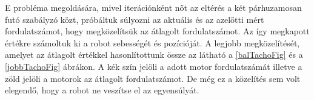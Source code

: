 E probléma megoldására, mivel iterációnként nőt az eltérés a két párhuzamosan futó szabályzó közt, próbáltuk súlyozni az aktuális és az azelőtti mért fordulatszámot, hogy megközelítsük az átlagolt fordulatszámot. Az így megkapott értékre számoltuk ki a robot sebességét és pozícióját. A legjobb megközelítését, amelyet az átlagolt értékkel hasonlítottunk össze az látható a \ref{balTachoFig} és a \ref{jobbTachoFig} ábrákon. A kék szín jelöli a adott motor fordulatszámát illetve a zöld jelöli a motorok az átlagolt fordulatszámot. De még ez a közelítés sem volt elegendő, hogy a robot ne veszítse el az egyensúlyát.







 
